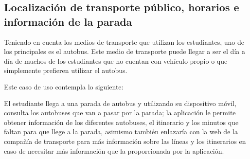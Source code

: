 \subsection{Localización de transporte público, horarios e información de la parada}

Teniendo en cuenta los medios de transporte que utilizan los estudiantes, uno de los principales es el autobus. Este medio de transporte puede llegar a ser el día a día de muchos de los estudiantes que no cuentan con vehículo propio o que simplemente prefieren utilizar el autobus. 

Este caso de uso contempla lo siguiente: 


El estudiante llega a una parada de autobus y utilizando su dispositivo móvil, consulta los autobuses que van a pasar por la parada; la aplicación le permite obtener información de los diferentes autobuses, el itinerario y los minutos que faltan para que llege a la parada, asimismo también enlazaría con la web de la compañía de transporte para más información sobre las líneas y los itinerarios en caso de necesitar más información que la proporcionada por la aplicación.